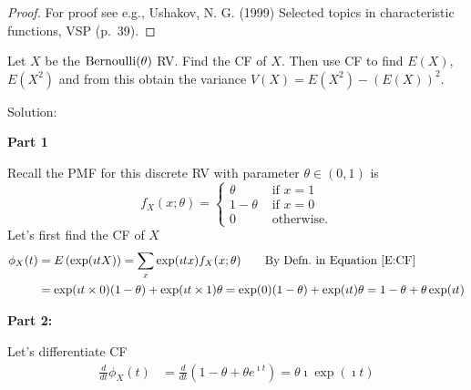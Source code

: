 \begin{proof}
For proof see e.g., Ushakov, N. G. (1999) Selected topics in characteristic functions, VSP (p.~39).
\end{proof}


\begin{example}
Let $X$ be the $\mbox{{\rm Bernoulli}}(\theta)$ RV.  
Find the CF of $X$.   
Then use CF to find $E(X)$, $E(X^2)$ and from this obtain the variance $V(X) = E(X^2)-(E(X))^2$.

Solution: 

{\bf Part 1}

Recall the PMF for this discrete RV with parameter $\theta \in (0,1)$ is
\[
f_X(x;\theta) = 
\begin{cases}
\theta & \text{ if } x = 1\\
1-\theta & \text{ if } x = 0\\
0 & \text{ otherwise}.
\end{cases}
\]
Let's first find the CF of $X$
\begin{align*}
\phi_X(t)
&= E \left( \exp(\imath t X) \right) 
= \sum_x  \exp(\imath t x) f_X(x;\theta) \qquad \text{By Defn.~in Equation~\eqref{E:CF}}\\
&= \exp(\imath t \times 0) (1-\theta) + \exp(\imath t \times 1) \theta 
= \exp(0) (1-\theta) + \exp(\imath t) \theta 
=  1-\theta + \theta \exp(\imath t)  
\end{align*}

{\bf Part 2:}

Let's differentiate CF 
\begin{align*}
\frac{d}{dt}\phi_X(t)
&= \frac{d}{dt}\left(1-\theta + \theta e^{\imath t} \right) 
=  \theta \imath \exp(\imath t)
\end{align*}


\end{example}
